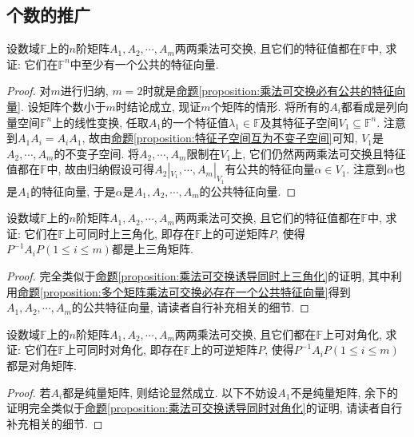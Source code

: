 \documentclass[../../main.tex]{subfiles}
\begin{document}
\subsection{个数的推广}

\begin{proposition}\label{proposition:多个矩阵乘法可交换必存在一个公共特征向量}
设数域\(\mathbb{F}\)上的\(n\)阶矩阵\(A_{1},A_{2},\cdots ,A_{m}\)两两乘法可交换, 且它们的特征值都在\(\mathbb{F}\)中, 求证: 它们在\(\mathbb{F}^n\)中至少有一个公共的特征向量.
\end{proposition}
\begin{proof}
对\(m\)进行归纳, \(m = 2\)时就是\hyperref[proposition:乘法可交换必有公共的特征向量]{命题\ref{proposition:乘法可交换必有公共的特征向量}}. 设矩阵个数小于\(m\)时结论成立, 现证\(m\)个矩阵的情形. 将所有的\(A_{i}\)都看成是列向量空间\(\mathbb{F}^n\)上的线性变换, 任取\(A_{1}\)的一个特征值\(\lambda_{1} \in \mathbb{F}\)及其特征子空间\(V_{1}\subseteq \mathbb{F}^n\). 注意到\(A_{1}A_{i}=A_{i}A_{1}\), 故由\hyperref[proposition:特征子空间互为不变子空间]{命题\ref{proposition:特征子空间互为不变子空间}}可知, \(V_{1}\)是\(A_{2},\cdots ,A_{m}\)的不变子空间. 将\(A_{2},\cdots ,A_{m}\)限制在\(V_{1}\)上, 它们仍然两两乘法可交换且特征值都在\(\mathbb{F}\)中, 故由归纳假设可得\(A_{2}|_{V_{1}},\cdots ,A_{m}|_{V_{1}}\)有公共的特征向量\(\alpha \in V_{1}\). 注意到\(\alpha\)也是\(A_{1}\)的特征向量, 于是\(\alpha\)是\(A_{1},A_{2},\cdots ,A_{m}\)的公共特征向量.
\end{proof}

\begin{proposition}\label{proposition:多个矩阵乘法可交换诱导同时上三角化}
设数域\(\mathbb{F}\)上的\(n\)阶矩阵\(A_{1},A_{2},\cdots ,A_{m}\)两两乘法可交换, 且它们的特征值都在\(\mathbb{F}\)中, 求证: 它们在\(\mathbb{F}\)上可同时上三角化, 即存在\(\mathbb{F}\)上的可逆矩阵\(P\), 使得\(P^{-1}A_{i}P(1\leq i\leq m)\)都是上三角矩阵.
\end{proposition}
\begin{proof}
完全类似于\hyperref[proposition:乘法可交换诱导同时上三角化]{命题\ref{proposition:乘法可交换诱导同时上三角化}}的证明, 其中利用\hyperref[proposition:多个矩阵乘法可交换必存在一个公共特征向量]{命题\ref{proposition:多个矩阵乘法可交换必存在一个公共特征向量}}得到\(A_{1},A_{2},\cdots ,A_{m}\)的公共特征向量, 请读者自行补充相关的细节.
\end{proof}

\begin{proposition}\label{proposition:多个矩阵乘法可交换诱导同时对角化}
设数域\(\mathbb{F}\)上的\(n\)阶矩阵\(A_{1},A_{2},\cdots ,A_{m}\)两两乘法可交换, 且它们都在\(\mathbb{F}\)上可对角化, 求证: 它们在\(\mathbb{F}\)上可同时对角化, 即存在\(\mathbb{F}\)上的可逆矩阵\(P\), 使得\(P^{-1}A_{i}P(1\leq i\leq m)\)都是对角矩阵.
\end{proposition}
\begin{proof}
若\(A_{i}\)都是纯量矩阵, 则结论显然成立. 以下不妨设\(A_{1}\)不是纯量矩阵, 余下的证明完全类似于\hyperref[proposition:乘法可交换诱导同时对角化]{命题\ref{proposition:乘法可交换诱导同时对角化}}的证明, 请读者自行补充相关的细节.
\end{proof}
\end{document}
